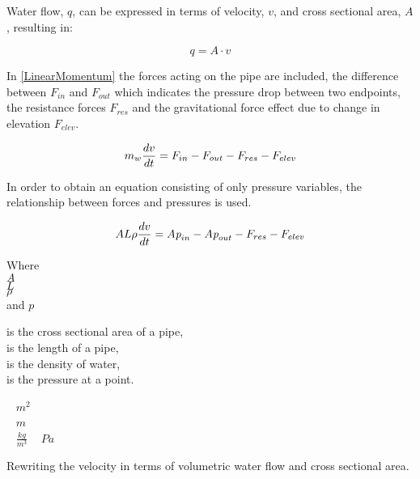 Water flow, $q$, can be expressed in terms of velocity, $v$, and cross sectional 
area, $A$, resulting in:

\begin{equation}
  q=A \cdot v
	\label{EquationOfContinuity}
\end{equation}

 In \eqref{LinearMomentum} the forces acting on the pipe are included, the difference between $F_{in}$ and $F_{out}$ which indicates the pressure drop 
 between two endpoints, the resistance forces $F_{res}$ and the gravitational force effect due to change in elevation $F_{elev}$.

\begin{equation}
  m_w \frac{dv}{dt} = F_{in} - F_{out} - F_{res} - F_{elev} \\
  \label{LinearMomentum}
\end{equation}

In order to obtain an equation consisting of only pressure variables, the relationship between forces and pressures is used.


 \begin{equation}
    A L \rho \frac{dv}{dt} = A \textit{p}_{in} - A \textit{p}_{out} - F_{res} - F_{elev} \\
\end{equation}

\begin{minipage}[t]{0.20\textwidth}
Where\\
\hspace*{8mm} $A$ \\
\hspace*{8mm} $L$ \\
\hspace*{8mm} $\rho$\\
and \hspace*{0.7mm} $p$ 
\end{minipage}
\begin{minipage}[t]{0.68\textwidth}
\vspace*{2mm}
is the cross sectional area of a pipe,\\
is the length of a pipe,\\
is the density of water,\\
is the pressure at a point.
\end{minipage}
\begin{minipage}[t]{0.10\textwidth}
\vspace*{2mm}
\textcolor{White}{te}$\unit{m^2}$\\
\textcolor{White}{te}$\unit{m}$\\
\textcolor{White}{te}$\unit{\frac{kg}{m^{3}}}$
\textcolor{White}{te}$\unit{Pa}$\\
\end{minipage}
%
Rewriting the velocity in terms of volumetric water flow and cross sectional 
area. 

